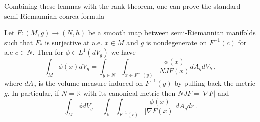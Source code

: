 Combining these lemmas with the rank theorem, one can prove the standard semi-Riemannian coarea formula
\begin{theorem}
Let $F:(M,g)\rightarrow (N,h)$ be a smooth map between semi-Riemannian manifolds such that $F_*$ is surjective at a.e. $x\in M$ and $g$ is nondegenerate on $F^{-1}(c)$ for a.e $c\in N$. Then for $\phi\in L^1(dV_g)$ we have
\begin{equation}
\int_M\phi(x)dV_g=\int_{y\in N}\int_{x\in F^{-1}(y)}\frac{\phi(x)}{NJF(x)}dA_g dV_h\,,
\end{equation}
where $dA_g$ is the volume measure induced on $F^{-1}(y)$ by pulling back the metric $g$. In particular, if $N=\mathbb{R}$ with its canonical metric then $NJF=|\nabla F|$ and 
\begin{equation}
\int_M \phi dV_g=\int_\mathbb{R}\int_{F^{-1}(r)}\frac{\phi(x)}{|\nabla F(x)|} dA_g dr\,.
\end{equation}
\end{theorem}

